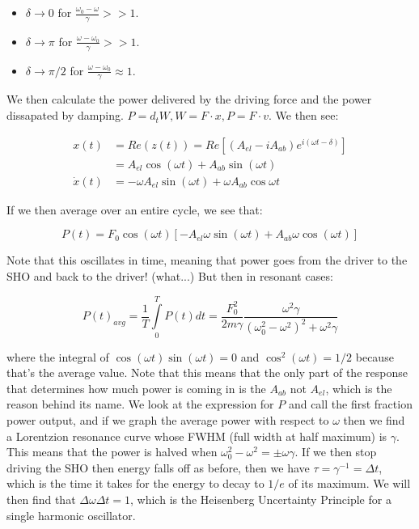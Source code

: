 \documentclass{report}
\begin{document}
\begin{itemize}
\item $\delta \to 0$ for $\frac{\omega_0 - \omega}{\gamma}>>1$. 
\item $\delta \to \pi$ for $\frac{\omega-\omega_0}{\gamma} >> 1$.
\item $\delta \to \pi/2$ for $\frac{\omega - \omega_0}{\gamma} \approx 1$. 
\end{itemize}

We then calculate the power delivered by the driving force and the power dissapated by damping. $P = d_tW, W = F \cdot x, P = F \cdot v$. We then see:

\begin{align*}
x(t) &= Re(z(t)) = Re[(A_{el} - iA_{ab})e^{i(\omega t - \delta)}]\\
&= A_{el}\cos(\omega t) + A_{ab}\sin(\omega t)\\
\dot{x}(t) &= -\omega A_{el}\sin(\omega t) + \omega A_{ab}\cos{\omega t}
\end{align*}

If we then average over an entire cycle, we see that:

$$P(t) = F_0\cos(\omega t)[-A_{el}\omega \sin(\omega t) + A_{ab}\omega\cos(\omega t)]$$

Note that this oscillates in time, meaning that power goes from the driver to the SHO and back to the driver! (what...) But then in resonant cases:

$$P(t)_{avg} = \frac{1}{T}\displaystyle\int\limits_0^T{P(t)dt} = \frac{F_0^2}{2m\gamma}\frac{\omega^2\gamma}{(\omega_0^2 - \omega^2)^2 + \omega^2\gamma}$$

where the integral of $\cos(\omega t)\sin(\omega t) = 0$ and $\cos^2(\omega t) = 1/2$ because that's the average value. Note that this means that the only part of the response that determines how much power is coming in is the $A_{ab}$ not $A_{el}$, which is the reason behind its name. We look at the expression for $P$ and call the first fraction power output, and if we graph the average power with respect to $\omega$ then we find a Lorentzion resonance curve whose FWHM (full width at half maximum) is $\gamma$. This means that the power is halved when $\omega_0^2 - \omega^2 = \pm\omega \gamma$. If we then stop driving the SHO then energy falls off as before, then we have $\tau = \gamma^{-1} = \Delta t$, which is the time it takes for the energy to decay to $1/e$ of its maximum. We will then find that $\Delta\omega\Delta t = 1$, which is the Heisenberg Uncertainty Principle for a single harmonic oscillator. 
\end{document}
